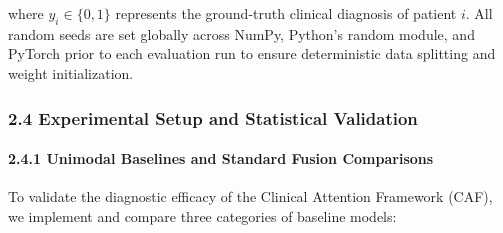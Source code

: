 \documentclass[
]{article}
\begin{document}
where \(y_{i} \in \{ 0,1\}\) represents the ground-truth clinical
diagnosis of patient \(i\). All random seeds are set globally across
NumPy, Python's random module, and PyTorch prior to each evaluation run
to ensure deterministic data splitting and weight initialization.

\subsubsection{\texorpdfstring{\textbf{2.4 Experimental Setup and
Statistical
Validation}}{2.4 Experimental Setup and Statistical Validation}}\label{experimental-setup-and-statistical-validation}

\paragraph{\texorpdfstring{\textbf{2.4.1 Unimodal Baselines and Standard
Fusion
Comparisons}}{2.4.1 Unimodal Baselines and Standard Fusion Comparisons}}\label{unimodal-baselines-and-standard-fusion-comparisons}

To validate the diagnostic efficacy of the Clinical Attention Framework
(CAF), we implement and compare three categories of baseline models:
\end{document}
